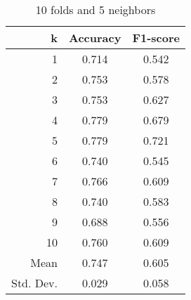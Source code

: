 \begin{table}
\centering
\caption{10 folds and 5 neighbors}
\begin{tabular}{rcc}
\toprule
         k &  Accuracy &  F1-score \\
\midrule
         1 &     0.714 &     0.542 \\
         2 &     0.753 &     0.578 \\
         3 &     0.753 &     0.627 \\
         4 &     0.779 &     0.679 \\
         5 &     0.779 &     0.721 \\
         6 &     0.740 &     0.545 \\
         7 &     0.766 &     0.609 \\
         8 &     0.740 &     0.583 \\
         9 &     0.688 &     0.556 \\
        10 &     0.760 &     0.609 \\
      Mean &     0.747 &     0.605 \\
 Std. Dev. &     0.029 &     0.058 \\
\bottomrule
\end{tabular}
\end{table}
